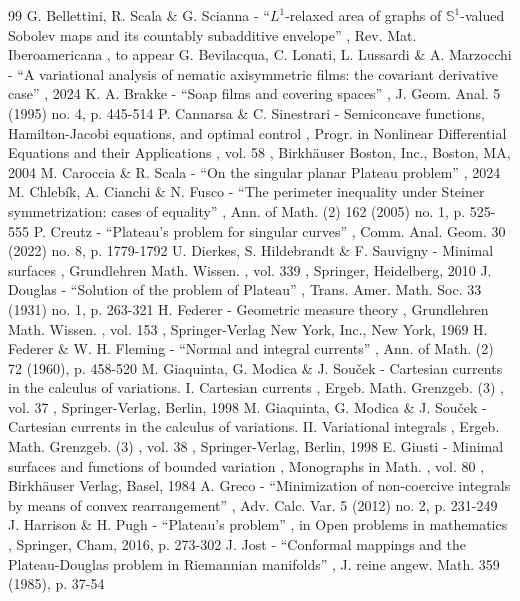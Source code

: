 \documentclass[11pt]{article}
\numberwithin{equation}{section}
\theoremstyle{definition}
\begin{document}
\begin{thebibliography}{99}
 G. Bellettini, R. Scala \& G. Scianna - “$L^1$-relaxed area of graphs of $\mathbb{S}^1$-valued Sobolev maps and its countably subadditive envelope” , Rev. Mat. Iberoamericana , to appear
 G. Bevilacqua, C. Lonati, L. Lussardi \& A. Marzocchi - “A variational analysis of nematic axisymmetric films: the covariant derivative case” , 2024
 K. A. Brakke - “Soap films and covering spaces” , J. Geom. Anal. 5 (1995) no. 4, p. 445-514
 P. Cannarsa \& C. Sinestrari - Semiconcave functions, Hamilton-Jacobi equations, and optimal control , Progr. in Nonlinear Differential Equations and their Applications , vol. 58 , Birkhäuser Boston, Inc., Boston, MA, 2004
 M. Caroccia \& R. Scala - “On the singular planar Plateau problem” , 2024
 M. Chlebík, A. Cianchi \& N. Fusco - “The perimeter inequality under Steiner symmetrization: cases of equality” , Ann. of Math. (2) 162 (2005) no. 1, p. 525-555
 P. Creutz - “Plateau’s problem for singular curves” , Comm. Anal. Geom. 30 (2022) no. 8, p. 1779-1792
 U. Dierkes, S. Hildebrandt \& F. Sauvigny - Minimal surfaces , Grundlehren Math. Wissen. , vol. 339 , Springer, Heidelberg, 2010
 J. Douglas - “Solution of the problem of Plateau” , Trans. Amer. Math. Soc. 33 (1931) no. 1, p. 263-321
 H. Federer - Geometric measure theory , Grundlehren Math. Wissen. , vol. 153 , Springer-Verlag New York, Inc., New York, 1969
 H. Federer \& W. H. Fleming - “Normal and integral currents” , Ann. of Math. (2) 72 (1960), p. 458-520
 M. Giaquinta, G. Modica \& J. Souček - Cartesian currents in the calculus of variations. I. Cartesian currents , Ergeb. Math. Grenzgeb. (3) , vol. 37 , Springer-Verlag, Berlin, 1998
 M. Giaquinta, G. Modica \& J. Souček - Cartesian currents in the calculus of variations. II. Variational integrals , Ergeb. Math. Grenzgeb. (3) , vol. 38 , Springer-Verlag, Berlin, 1998
 E. Giusti - Minimal surfaces and functions of bounded variation , Monographs in Math. , vol. 80 , Birkhäuser Verlag, Basel, 1984
 A. Greco - “Minimization of non-coercive integrals by means of convex rearrangement” , Adv. Calc. Var. 5 (2012) no. 2, p. 231-249
 J. Harrison \& H. Pugh - “Plateau’s problem” , in Open problems in mathematics , Springer, Cham, 2016, p. 273-302
 J. Jost - “Conformal mappings and the Plateau-Douglas problem in Riemannian manifolds” , J. reine angew. Math. 359 (1985), p. 37-54

\end{thebibliography}
\end{document}
